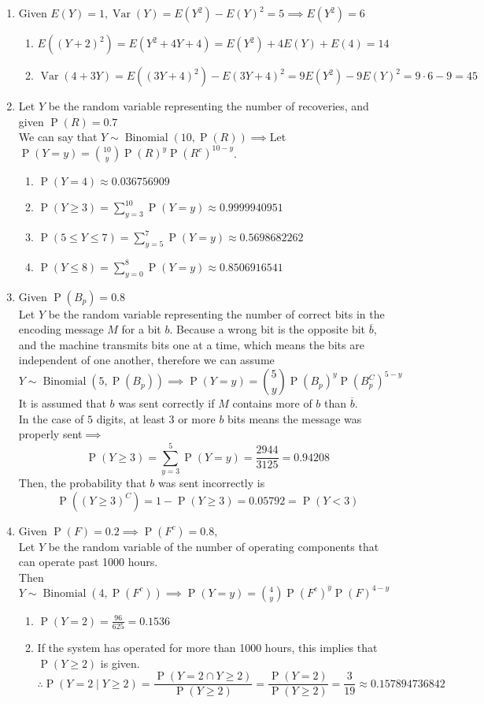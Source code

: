 \documentclass{article}
\newcommand{\pr}[1]{\operatorname{P}(#1)}
\newcommand{\var}[1]{\operatorname{Var}(#1)}
\newcommand{\binomdist}[3]{#1 \sim \operatorname{Binomial}(#2, #3)}
\begin{document}
\begin{enumerate}
  \item Given $E(Y) = 1, \var{Y} = E(Y^2) - E(Y)^2 = 5 \implies E(Y^2) = 6$
  \begin{enumerate}
    \item $E((Y+2)^2) = E(Y^2+4Y+4) = E(Y^2) + 4E(Y) + E(4) = 14$
    \item $\var{4+3Y} = E((3Y+4)^2) - E(3Y+4)^2 = 9E(Y^2) - 9E(Y)^2 = 9\cdot 6 - 9 = 45$
  \end{enumerate}
  
  \item Let $Y$ be the random variable representing the number of recoveries, and given $\pr{R} = 0.7$\\
  We can say that $\binomdist{Y}{10}{\pr{R}} \implies$Let $\pr{Y=y} = \binom{10}{y}\pr{R}^y\pr{R^c}^{10-y}$.
  \begin{enumerate}
    \item $\pr{Y=4} \approx 0.036756909$
    \item $\pr{Y \geq 3} = \sum_{y=3}^{10}\pr{Y=y} \approx 0.9999940951$
    \item $\pr{5\leq Y \leq 7} = \sum_{y=5}^{7}\pr{Y=y} \approx 0.5698682262$
    \item $\pr{Y \leq 8} = \sum_{y=0}^{8}\pr{Y=y} \approx 0.8506916541$
  \end{enumerate}
  
  \item Given $\pr{B_p} = 0.8$\\
  Let $Y$ be the random variable representing the number of correct bits in the encoding message $M$ for a bit $b$.
  Because a wrong bit is the opposite bit $\overline{b}$, and the machine transmits bits one at a time, 
  which means the bits are independent of one another, therefore we can assume
  \[\binomdist{Y}{5}{\pr{B_p}} \implies \pr{Y=y} = \binom{5}{y}\pr{B_p}^y\pr{B_p^C}^{5-y}\]
  It is assumed that $b$ was sent correctly 
  if $M$ contains more of $b$ than $\overline{b}$.\\
  In the case of $5$ digits, at least $3$ or more $b$ bits means the message was properly sent$\implies$
  \[ \pr{Y\geq 3} = \sum_{y=3}^{5}\pr{Y=y} = \frac{2944}{3125} = 0.94208\]
  Then, the probability that $b$ was sent incorrectly is
  \[ \pr{(Y \geq 3)^C} = 1-\pr{Y \geq 3} = 0.05792 = \pr{Y < 3}\]

  \item Given $\pr{F} = 0.2 \implies \pr{F^c} = 0.8$,\\ 
  Let $Y$ be the random variable of the number of
  operating components that can operate past 1000 hours.\\
  Then $\binomdist{Y}{4}{\pr{F^c}} 
  \implies \pr{Y=y} = \binom{4}{y}\pr{F^c}^y\pr{F}^{4-y}$
  \begin{enumerate}
    \item $\pr{Y=2} = \frac{96}{625} = 0.1536$
    \item If the system has operated for more than 1000 hours, this implies that $\pr{Y \geq 2}$ is given.
    \[
      \therefore \pr{Y = 2 \mid Y \geq 2} 
      = \frac{\pr{Y = 2 \cap Y \geq 2}}{\pr{Y \geq 2}} 
      = \frac{\pr{Y = 2}}{\pr{Y \geq 2}} 
      = \frac{3}{19} \approx 0.157894736842
    \]
  \end{enumerate}
  

\end{enumerate}
\end{document}

